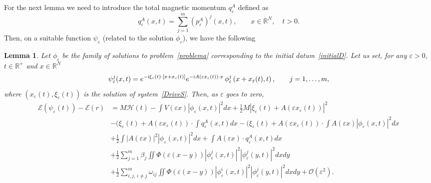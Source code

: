 \documentclass[11pt]{amsart}
\numberwithin{equation}{section}
\newtheorem{lemma}[theorem]{Lemma}
\theoremstyle{definition}
\begin{document}
\noindent
For the next lemma we need to introduce the  total magnetic momentum $q^A_{\varepsilon}$ defined as
$$
q^A_{\varepsilon}(x,t)=\sum_{j=1}^m (p_{\varepsilon}^A)^j(x,t), \qquad x\in{{\mathbb R}}^N, \quad t>0.
$$
Then, on a suitable function $\psi_{\varepsilon}$ (related to the solution $\phi_{\varepsilon}$), we have the following
\begin{lemma}
    \label{estDUE}
Let $\phi_{\varepsilon}$ be the family of solutions to problem~\eqref{problema}
corresponding to the initial datum~\eqref{initialD}.
Let us set, for any ${\varepsilon}>0$, $t\in{{\mathbb R}}^+$ and $x\in{{\mathbb R}}^N$
\begin{equation}
\label{veps} \psi_{\varepsilon}^j(x,t) =e^{-{\rm{{\rm i}}}\xi_{\varepsilon}(t)\cdot [x+x_{\varepsilon}(t)]} e^{-{{\rm i}} A({\varepsilon}
x_{\varepsilon}(t))\cdot x} \,\phi_{\varepsilon}^j\left(x+x_{\varepsilon}(t), t\right),\qquad j=1,\dots,m,
\end{equation}
where $(x_{\varepsilon}(t), \xi_{\varepsilon}(t))$ is the solution of system~\eqref{DriveS}.
Then, as ${\varepsilon}$ goes to zero,
\begin{align*}
\mathcal E(\psi_{\varepsilon}(t)) -{\mathcal E}(r) &=M{\mathcal H}(t)
-\int V({\varepsilon} x)|\phi_{\varepsilon}(x,t)|^{2}dx
+\frac12 M|\xi_{\varepsilon}(t)+A({\varepsilon} x_{\varepsilon}(t))|^2 \\
& -(\xi_{\varepsilon}(t)+A({\varepsilon} x_{\varepsilon}(t))\cdot \int q_{\varepsilon}^A(x,t)dx
-(\xi_{\varepsilon}(t)+A({\varepsilon} x_{\varepsilon}(t))\cdot
\int A({\varepsilon} x)|\phi_{\varepsilon}(x,t)|^2dx\\
& +\frac{1}{2}\int |A({\varepsilon} x)|^2|\phi_{\varepsilon}(x,t)|^2dx +\int A({\varepsilon}
x)\cdot q_{\varepsilon}^A(x,t)dx  \\
& +\frac{1}{2}\sum_{j=1}^m\beta_j \iint \Phi({\varepsilon} (x-y))|\phi_{\varepsilon}^j(x,t)|^2|\phi^j_{\varepsilon}(y,t)|^2 dx dy \\
& +\frac{1}{2}\sum_{i,j,\,i\neq j}^m\omega_{ij} \iint
\Phi({\varepsilon}(x-y))|\phi_{\varepsilon}^i(x,t)|^2|\phi^j_{\varepsilon}(y,t)|^2 dx dy+{\mathcal O}({\varepsilon}^2).
\end{align*}
\end{lemma}
\end{document}
